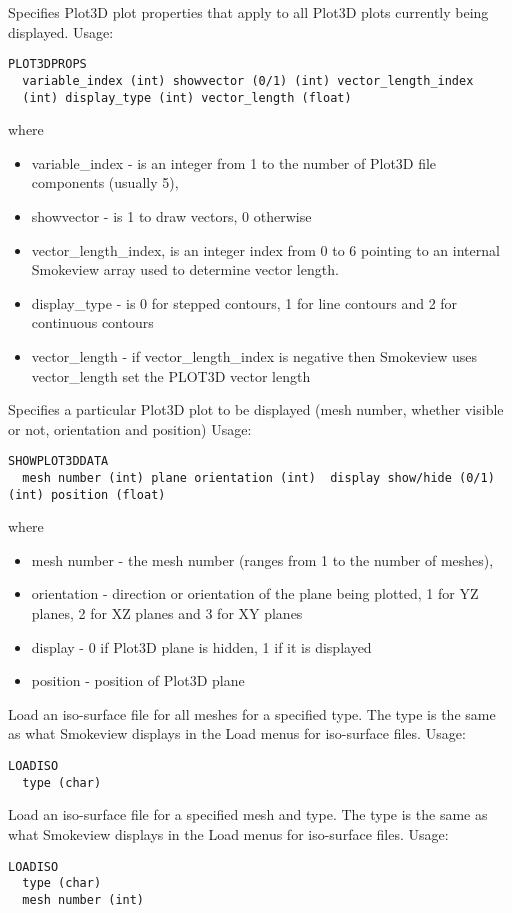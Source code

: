 \documentclass[11pt,twoside]{book}
\newcommand{\hitem}[1]{\item[{\bf #1} \hfill]}
\begin{document}
\hitem{PLOT3DPROPS}Specifies Plot3D plot properties that
apply to all Plot3D plots currently being displayed.
Usage:
\begin{lstlisting}
PLOT3DPROPS
  variable_index (int) showvector (0/1) (int) vector_length_index
  (int) display_type (int) vector_length (float)
\end{lstlisting}
where
\begin{itemize}
\item variable\_index - is an integer from 1 to the number of
Plot3D file components (usually 5),
\item showvector - is 1 to draw vectors, 0 otherwise
\item vector\_length\_index, is an integer index from 0 to 6
pointing to an internal Smokeview array used to determine vector length.
\item display\_type - is 0 for stepped contours, 1 for line
contours and 2 for continuous contours
\item vector\_length - if vector\_length\_index is negative
then Smokeview uses vector\_length set the PLOT3D vector length
\end{itemize}

\hitem{SHOWPLOT3DDATA}Specifies a particular Plot3D plot to be
displayed (mesh number, whether visible or not, orientation and position)
Usage:
\begin{lstlisting}
SHOWPLOT3DDATA
  mesh number (int) plane orientation (int)  display show/hide (0/1) (int) position (float)
\end{lstlisting}
where
\begin{itemize}
\item mesh number - the mesh number (ranges from 1 to the number of meshes),
\item orientation - direction or orientation of the plane being plotted, 1 for YZ planes, 2 for XZ planes and 3 for XY planes
\item display - 0 if Plot3D plane is hidden, 1 if it is displayed
\item position - position of Plot3D plane
\end{itemize}

\hitem{LOADISO}Load an iso-surface file for all meshes for a specified type.
The type is the same as what Smokeview displays in the Load menus for iso-surface files.
Usage:
\begin{lstlisting}
LOADISO
  type (char)
\end{lstlisting}

\hitem{LOADISOM}Load an iso-surface file for a specified mesh and type.
The type is the same as what Smokeview displays in the Load menus for iso-surface files.
Usage:
\begin{lstlisting}
LOADISO
  type (char)
  mesh number (int)
\end{lstlisting}
\end{document}
